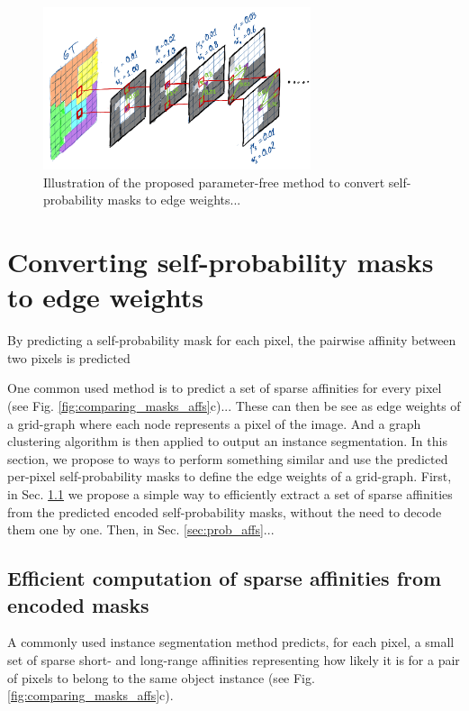 
\begin{figure}[t]
\centering
        \includegraphics[width=0.7\textwidth]{./figs/alg_explaned.jpg} %
        \caption{Illustration of the proposed parameter-free method to convert self-probability masks to edge weights...}
    \label{fig:alg_explained}
\end{figure}

\section{Converting self-probability masks to edge weights}
By predicting a self-probability mask for each pixel, the pairwise affinity between two pixels is predicted 


One common used method is to predict a set of sparse affinities for every pixel (see Fig. \ref{fig:comparing_masks_affs}c)... 
These can then be see as edge weights of a grid-graph where each node represents a pixel of the image. And a graph clustering algorithm is then applied to output an instance segmentation.
In this section, we propose to ways to perform something similar and use the predicted per-pixel self-probability masks to define the edge weights of a grid-graph.
First, in Sec. \ref{sec:efficient_affs} we propose a simple way to efficiently extract a set of sparse affinities from the predicted encoded self-probability masks, without the need to decode them one by one. Then, in Sec. \ref{sec:prob_affs}...

\subsection{Efficient computation of sparse affinities from encoded masks}\label{sec:efficient_affs}
A commonly used instance segmentation method predicts, for each pixel, a small set of sparse short- and long-range affinities representing how likely it is for a pair of pixels to belong to the same object instance (see Fig. \ref{fig:comparing_masks_affs}c).



